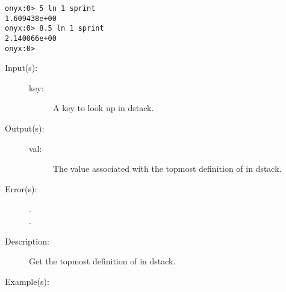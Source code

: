 \begin{description}
\begin{description}
\begin{verbatim}
onyx:0> 5 ln 1 sprint
1.609438e+00
onyx:0> 8.5 ln 1 sprint
2.140066e+00
onyx:0>
		\end{verbatim}
	\end{description}
\label{systemdict:load}
\item[{\onyxop{key}{load}{val}}: ]
	\begin{description}\item[]
	\item[Input(s): ]
		\begin{description}\item[]
		\item[key: ]
			A key to look up in dstack.
		\end{description}
	\item[Output(s): ]
		\begin{description}\item[]
		\item[val: ]
			The value associated with the topmost definition of
			 in dstack.
		\end{description}
	\item[Error(s): ]
		\begin{description}\item[]
		\item[.]
		\item[.]
		\end{description}
	\item[Description: ]
		Get the topmost definition of  in dstack.
	\item[Example(s): ]\begin{verbatim}


\end{verbatim}
\end{description}
\end{description}
